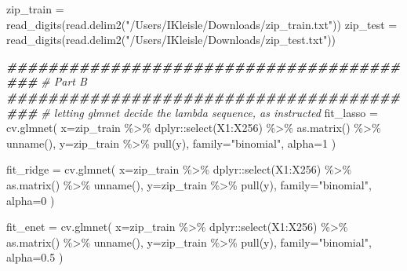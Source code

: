 \documentclass[
]{article}
\newenvironment{Shaded}{\begin{snugshade}}{\end{snugshade}}
\newcommand{\AttributeTok}[1]{\textcolor[rgb]{0.77,0.63,0.00}{#1}}
\newcommand{\CommentTok}[1]{\textcolor[rgb]{0.56,0.35,0.01}{\textit{#1}}}
\newcommand{\DecValTok}[1]{\textcolor[rgb]{0.00,0.00,0.81}{#1}}
\newcommand{\DocumentationTok}[1]{\textcolor[rgb]{0.56,0.35,0.01}{\textbf{\textit{#1}}}}
\newcommand{\FloatTok}[1]{\textcolor[rgb]{0.00,0.00,0.81}{#1}}
\newcommand{\FunctionTok}[1]{\textcolor[rgb]{0.00,0.00,0.00}{#1}}
\newcommand{\NormalTok}[1]{#1}
\newcommand{\OtherTok}[1]{\textcolor[rgb]{0.56,0.35,0.01}{#1}}
\newcommand{\SpecialCharTok}[1]{\textcolor[rgb]{0.00,0.00,0.00}{#1}}
\newcommand{\StringTok}[1]{\textcolor[rgb]{0.31,0.60,0.02}{#1}}
\begin{document}
\begin{Shaded}
\begin{Highlighting}[]
\NormalTok{zip\_train }\OtherTok{=} \FunctionTok{read\_digits}\NormalTok{(}\FunctionTok{read.delim2}\NormalTok{(}\StringTok{"/Users/IKleisle/Downloads/zip\_train.txt"}\NormalTok{)) }
\NormalTok{zip\_test }\OtherTok{=} \FunctionTok{read\_digits}\NormalTok{(}\FunctionTok{read.delim2}\NormalTok{(}\StringTok{"/Users/IKleisle/Downloads/zip\_test.txt"}\NormalTok{))}


\DocumentationTok{\#\#\#\#\#\#\#\#\#\#\#\#\#\#\#\#\#\#\#\#\#\#\#\#\#\#\#\#\#\#\#\#\#\#\#\#\#\#\#\#\#}
\CommentTok{\# Part B}
\DocumentationTok{\#\#\#\#\#\#\#\#\#\#\#\#\#\#\#\#\#\#\#\#\#\#\#\#\#\#\#\#\#\#\#\#\#\#\#\#\#\#\#\#\#}
\CommentTok{\# letting glmnet decide the lambda sequence, as instructed}
\NormalTok{fit\_lasso }\OtherTok{=} \FunctionTok{cv.glmnet}\NormalTok{(}
  \AttributeTok{x=}\NormalTok{zip\_train }\SpecialCharTok{\%\textgreater{}\%}\NormalTok{ dplyr}\SpecialCharTok{::}\FunctionTok{select}\NormalTok{(X1}\SpecialCharTok{:}\NormalTok{X256) }\SpecialCharTok{\%\textgreater{}\%} \FunctionTok{as.matrix}\NormalTok{() }\SpecialCharTok{\%\textgreater{}\%} \FunctionTok{unname}\NormalTok{(),}
  \AttributeTok{y=}\NormalTok{zip\_train }\SpecialCharTok{\%\textgreater{}\%} \FunctionTok{pull}\NormalTok{(y),}
  \AttributeTok{family=}\StringTok{"binomial"}\NormalTok{,}
  \AttributeTok{alpha=}\DecValTok{1}
\NormalTok{)}

\NormalTok{fit\_ridge }\OtherTok{=} \FunctionTok{cv.glmnet}\NormalTok{(}
  \AttributeTok{x=}\NormalTok{zip\_train }\SpecialCharTok{\%\textgreater{}\%}\NormalTok{ dplyr}\SpecialCharTok{::}\FunctionTok{select}\NormalTok{(X1}\SpecialCharTok{:}\NormalTok{X256) }\SpecialCharTok{\%\textgreater{}\%} \FunctionTok{as.matrix}\NormalTok{() }\SpecialCharTok{\%\textgreater{}\%} \FunctionTok{unname}\NormalTok{(),}
  \AttributeTok{y=}\NormalTok{zip\_train }\SpecialCharTok{\%\textgreater{}\%} \FunctionTok{pull}\NormalTok{(y),}
  \AttributeTok{family=}\StringTok{"binomial"}\NormalTok{,}
  \AttributeTok{alpha=}\DecValTok{0}
\NormalTok{)}

\NormalTok{fit\_enet }\OtherTok{=} \FunctionTok{cv.glmnet}\NormalTok{(}
  \AttributeTok{x=}\NormalTok{zip\_train }\SpecialCharTok{\%\textgreater{}\%}\NormalTok{ dplyr}\SpecialCharTok{::}\FunctionTok{select}\NormalTok{(X1}\SpecialCharTok{:}\NormalTok{X256) }\SpecialCharTok{\%\textgreater{}\%} \FunctionTok{as.matrix}\NormalTok{() }\SpecialCharTok{\%\textgreater{}\%} \FunctionTok{unname}\NormalTok{(),}
  \AttributeTok{y=}\NormalTok{zip\_train }\SpecialCharTok{\%\textgreater{}\%} \FunctionTok{pull}\NormalTok{(y),}
  \AttributeTok{family=}\StringTok{"binomial"}\NormalTok{,}
  \AttributeTok{alpha=}\FloatTok{0.5}
\NormalTok{)}


\end{Highlighting}
\end{Shaded}
\end{document}
